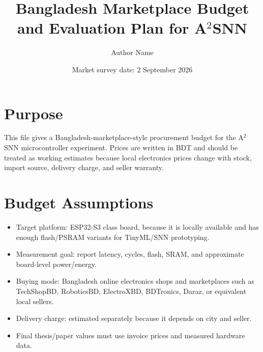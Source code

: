 \documentclass[11pt]{article}
\title{Bangladesh Marketplace Budget and Evaluation Plan for A$^2$SNN}
\author{Author Name}
\date{Market survey date: 2 September 2026}
\begin{document}
\maketitle

\section*{Purpose}
This file gives a Bangladesh-marketplace-style procurement budget for the A$^2$SNN microcontroller experiment. Prices are written in BDT and should be treated as working estimates because local electronics prices change with stock, import source, delivery charge, and seller warranty.

\section*{Budget Assumptions}
\begin{itemize}
    \item Target platform: ESP32-S3 class board, because it is locally available and has enough flash/PSRAM variants for TinyML/SNN prototyping.
    \item Measurement goal: report latency, cycles, flash, SRAM, and approximate board-level power/energy.
    \item Buying mode: Bangladesh online electronics shops and marketplaces such as TechShopBD, RoboticsBD, ElectroXBD, BDTronics, Daraz, or equivalent local sellers.
    \item Delivery charge: estimated separately because it depends on city and seller.
    \item Final thesis/paper values must use invoice prices and measured hardware data.
\end{itemize}
\end{document}
